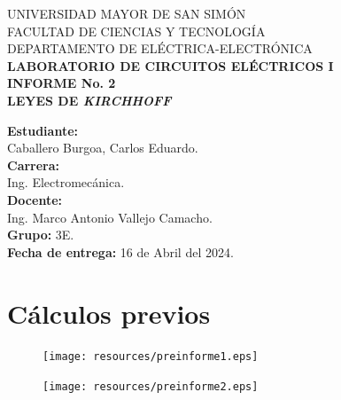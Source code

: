 \documentclass[letter,11pt]{article}
\begin{document}
\begin{titlepage}
    \begin{center}
        {\Large UNIVERSIDAD MAYOR DE SAN SIMÓN}\\
        \vspace*{0.15cm}
        {\large FACULTAD DE CIENCIAS Y TECNOLOGÍA}\\
        \vspace*{0.10cm}
        DEPARTAMENTO DE ELÉCTRICA-ELECTRÓNICA\\
        \vspace*{3.0cm}
        {\Large \textbf{LABORATORIO DE CIRCUITOS ELÉCTRICOS I}}\\
        \vspace*{0.3cm}
        {\Large \textbf{INFORME No. 2}}\\
        \vspace*{3.5cm}
        {\Large \textbf{LEYES DE \emph{KIRCHHOFF}}}\\
    \end{center}

    \vspace*{6.4cm}
    \leftskip=7.95cm
    \noindent
    \textbf{Estudiante:}\\
    Caballero Burgoa, Carlos Eduardo.\\
    \newline
    \textbf{Carrera:}\\
    Ing. Electromecánica.\\
    \newline
    \textbf{Docente:}\\
    Ing. Marco Antonio Vallejo Camacho.\\
    \newline
    \textbf{Grupo:} 3E.\\
    \textbf{Fecha de entrega:} 16 de Abril del 2024.\\
\end{titlepage}

\section{Cálculos previos}

\begin{figure}[!h]
\centering
\texttt{[image: resources/preinforme1.eps]}
\end{figure}

\begin{figure}[!h]
\centering
\texttt{[image: resources/preinforme2.eps]}
\end{figure}
\end{document}
